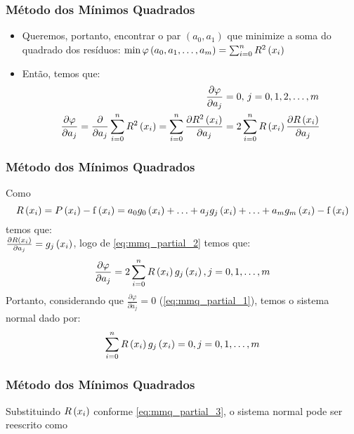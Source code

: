 \begin{frame}
\frametitle{Método dos Mínimos Quadrados}

\begin{itemize}
  \item Queremos, portanto, encontrar o par $\left(a_0, a_1\right)$ que minimize a soma do quadrado dos resíduos: $\min \varphi\left(a_0,a_1,\ldots,a_m\right) = \sum_{i=0}^{n}R^2\left(x_i\right)$
  \item Então, temos que:
\begin{align}
\frac{\partial \varphi}{\partial a_j} &= 0,\, j = 0,1,2,\ldots,m\label{eq:mmq_partial_1}\\
%
\frac{\partial \varphi}{\partial a_j} = %
\frac{\partial}{\partial a_j} \sum_{i=0}^{n} R^2 \left(\x_i\right) = %
\sum_{i=0}^{n} \frac{\partial R^2 \left(\x_i\right)}{\partial a_j} &= %
2 \sum_{i=0}^{n} R\left(\x_i\right) \frac{\partial R \left(\x_i\right)}{\partial a_j}\label{eq:mmq_partial_2}
\end{align}
%
\end{itemize}
\end{frame}

\begin{frame}
\frametitle{Método dos Mínimos Quadrados}

Como
{
\footnotesize
\begin{equation}
\label{eq:mmq_partial_3}
R\left(x_i\right) = P\left(x_i\right) - \mathrm{f}\left(x_i\right) = a_0 g_0 \left(x_i\right) + \ldots + a_j g_j \left(x_i\right) + \ldots + a_m g_m \left(x_i\right) - \mathrm{f} \left(x_i\right)
\end{equation}}%
temos que:\\
$\frac{\partial R \left(x_i\right)}{\partial a_j} = g_j \left(x_i\right)$, logo de \cref{eq:mmq_partial_2} temos que:
\[
\frac{\partial \varphi}{\partial a_j} = 2 \sum_{i=0}^{n} R\left(x_i\right) g_j \left(x_i\right), j = 0,1,\ldots,m
\]
Portanto, considerando que $\frac{\partial \varphi}{\partial a_j} = 0$ (\cref{eq:mmq_partial_1}), temos o sistema normal dado por:
\[
\sum_{i=0}^{n} R\left(x_i\right) g_j \left(x_i\right) = 0, j = 0, 1, \ldots, m
\]
\end{frame}

\begin{frame}
\frametitle{Método dos Mínimos Quadrados}

Substituindo $R\left(x_i\right)$ conforme \cref{eq:mmq_partial_3}, o sistema normal pode ser reescrito como
\[
\]
\end{frame}